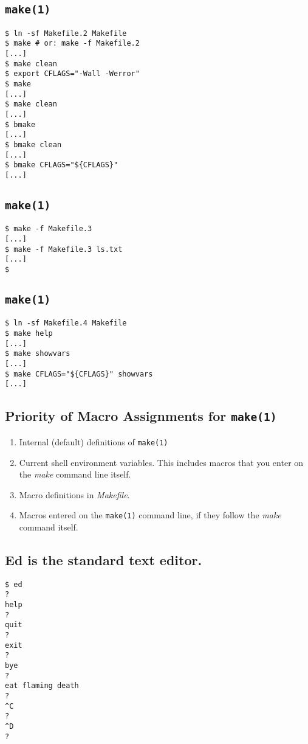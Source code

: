 \documentclass[xga]{xdvislides}
\newcommand{\smallish}{\fontsize{18}{18}\selectfont}
\begin{document}
\subsection{{\tt make(1)}}
\begin{verbatim}
$ ln -sf Makefile.2 Makefile
$ make # or: make -f Makefile.2
[...]
$ make clean
$ export CFLAGS="-Wall -Werror"
$ make
[...]
$ make clean
[...]
$ bmake
[...]
$ bmake clean
[...]
$ bmake CFLAGS="${CFLAGS}"
[...]
\end{verbatim}

\subsection{{\tt make(1)}}
\begin{verbatim}
$ make -f Makefile.3
[...]
$ make -f Makefile.3 ls.txt
[...]
$
\end{verbatim}

\subsection{{\tt make(1)}}
\smallish
\begin{verbatim}
$ ln -sf Makefile.4 Makefile
$ make help
[...]
$ make showvars
[...]
$ make CFLAGS="${CFLAGS}" showvars
[...]
\end{verbatim}
\Normalsize

\subsection{Priority of Macro Assignments for {\tt make(1)}}

\begin{enumerate}
	\item Internal (default) definitions of {\tt make(1)}
	\item Current shell environment variables.  This includes macros that you
		enter on the {\em make} command line itself.
	\item Macro definitions in {\em Makefile}.
	\item Macros entered on the {\tt make(1)} command line, if they follow
		the {\em make} command itself.
\end{enumerate}

\subsection{Ed is the standard text editor.}
\begin{verbatim}
$ ed
?
help
?
quit
?
exit
?
bye
?
eat flaming death
?
^C
?
^D
?
\end{verbatim}
\end{document}
